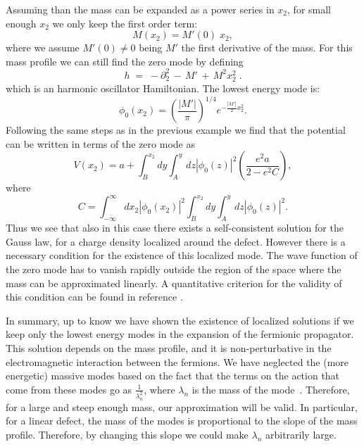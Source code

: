 \documentclass[a4paper,12pt]{article}
\begin{document}
{{\begin{itemize}
  Assuming than the mass can be expanded as a power series in $x_2$,
  for small enough $x_2$ we only keep the first order term:
\begin{equation}
M(x_2)=M'(0)\;x_2,
\end{equation}
where we assume $M'(0)\neq 0$ being $M'$ the first derivative of the
mass.  For this mass profile we can still find the zero mode by
defining~\cite{p1}
\begin{equation}
h\;=\;-\partial_2^2\,-\, M'\,+\,M^2 x_2^2\;.
\end{equation}
which is an harmonic oscillator Hamiltonian. The lowest energy mode
is:
\begin{equation}
\phi_0(x_2)=(\frac{|M'|}{\pi})^{1/4}e^{-\frac{|M'|}{2}x_2^2}.
\end{equation}
Following the same steps as in the previous example we find that the
potential can be written in terms of the zero mode as
\begin{equation}
V(x_2)=a+\int_B^{x_2} dy \int_A^y dz |\phi_0(z)|^2(\frac{e^2a}{2-e^2C}),
\end{equation}
where
\begin{equation}
C=\int_{-\infty}^{\infty}dx_2 |\phi_0(x_2)|^2 \int_B^{x_2} dy \int_A^y dz |\phi_0(z)|^2.
\end{equation}
Thus we see that also in this case there exists a self-consistent
solution for the Gauss law, for a charge density localized around the
defect.  However there is a necessary condition for the existence of
this localized mode. The wave function of the zero mode has to vanish
rapidly outside the region of the space where the mass can be
approximated linearly. A quantitative criterion for the validity of
this condition can be found in reference \cite{p1}.

\end{itemize}

In summary, up to know we have shown the existence of localized
solutions if we keep only the lowest energy modes in the expansion of
the fermionic propagator. This solution depends on the mass profile,
and it is non-perturbative in the electromagnetic interaction between
the fermions.  We have neglected the (more energetic) massive modes
based on the fact that the terms on the action that come from these
modes go as $\frac{1}{\lambda_n^2}$, where $\lambda_n$ is the mass of
the mode~\cite{p1}. Therefore, for a large and steep enough mass, our
approximation will be valid. In particular, for a linear defect, the
mass of the modes is proportional to the slope of the mass profile.
Therefore, by changing this slope we could make $\lambda_n$
arbitrarily large.

}}
\end{document}
